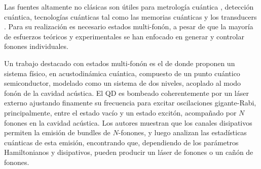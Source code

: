 \documentclass[../main.tex]{subfiles}
\begin{document}
Las fuentes altamente no clásicas son útiles para metrología cuántica \parencite{Zhang2018}, detección cuántica, tecnologías cuánticas tal como las memorias cuánticas y los transducers \parencite{Arrangoiz2018}. Para su realización es necesario estados multi-fonón, a pesar de que la mayoría de esfuerzos teóricos y experimentales se han enfocado en generar y controlar fonones individuales.

Un trabajo destacado con estados multi-fonón es el de \textcite{Bin2020} donde proponen un sistema físico, en acustodinámica cuántica, compuesto de un punto cuántico semiconductor, modelado como un sistema de dos niveles, acoplado al modo fonón de la cavidad acústica. El QD es bombeado coherentemente por un láser externo ajustando finamente su frecuencia para excitar oscilaciones gigante-Rabi, principalmente, entre el estado vacío y un estado excitón, acompañado por $N$ fonones en la cavidad acústica. Los autores muestran que los canales disipativos permiten la emisión de bundles de $N$-fonones, y luego analizan las estadísticas cuánticas de esta emisión, encontrando que, dependiendo de los parámetros Hamiltonianos y disipativos, pueden producir un láser de fonones o un cañón de fonones.

\end{document}
